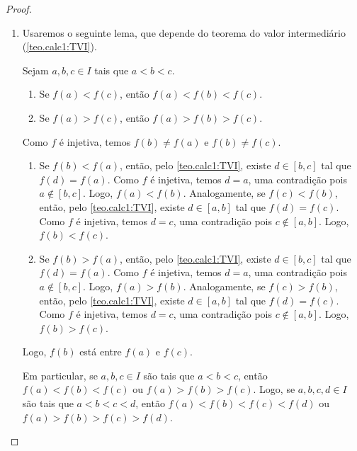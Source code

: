 \begin{proof}
    \leavevmode
        \begin{enumerate}[leftmargin=*, align=left, label=\textbf{(\alph*)}]
            \item {}
            Usaremos o seguinte lema, que depende do teorema do valor intermediário (\ref{teo.calc1:TVI}).
                \begin{claim}
                    Sejam $a,b,c \in I$ tais que $a<b<c$. 
                        \begin{enumerate}[label=\roman*.]
                            \item Se $f(a) < f(c)$, então $f(a)<f(b)<f(c)$.
                            \item Se $f(a) > f(c)$, então $f(a)>f(b)>f(c)$.
                        \end{enumerate}
                \end{claim}
                \begin{midproof}
                    Como $f$ é injetiva, temos $f(b) \neq f(a)$ e $f(b) \neq f(c)$.
                        \begin{enumerate}[label=\roman*.]
                            \item Se $f(b) < f(a)$, então, pelo \cref{teo.calc1:TVI}, existe $d \in [b,c]$ tal que $f(d) = f(a)$. Como $f$ é injetiva, temos $d=a$, uma contradição pois $a \notin [b,c]$. Logo, $f(a) < f(b)$. Analogamente, se $f(c) < f(b)$, então, pelo \cref{teo.calc1:TVI}, existe $d \in [a,b]$ tal que $f(d)=f(c)$. Como $f$ é injetiva, temos $d=c$, uma contradição pois $c \notin [a,b]$. Logo, $f(b) < f(c)$.
                            \item Se $f(b) > f(a)$, então, pelo \cref{teo.calc1:TVI}, existe $d \in [b,c]$ tal que $f(d) = f(a)$. Como $f$ é injetiva, temos $d=a$, uma contradição pois $a \notin [b,c]$. Logo, $f(a) > f(b)$. Analogamente, se $f(c) > f(b)$, então, pelo \cref{teo.calc1:TVI}, existe $d \in [a,b]$ tal que $f(d)=f(c)$. Como $f$ é injetiva, temos $d=c$, uma contradição pois $c \notin [a,b]$. Logo, $f(b) > f(c)$.
                        \end{enumerate}
                    Logo, $f(b)$ está entre $f(a)$ e $f(c)$. \whiteproof
                \end{midproof}
            Em particular, se $a,b,c \in I$ são tais que $a<b<c$, então $f(a)<f(b)<f(c)$ ou $f(a)>f(b)>f(c)$. Logo, se $a,b,c,d \in I$ são tais que $a<b<c<d$, então $f(a)<f(b)<f(c)<f(d)$ ou $f(a)>f(b)>f(c)>f(d)$.

\end{enumerate}
\end{proof}
